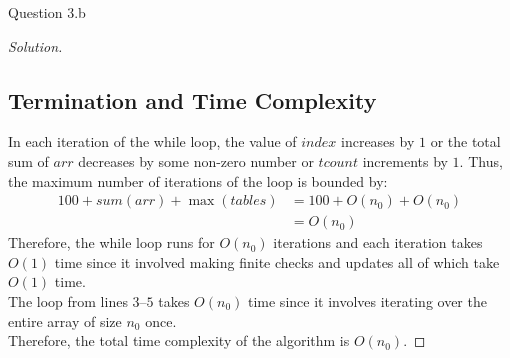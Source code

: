 \begin{solution}{Question 3.b}
\begin{proof}[Solution]
        \subsection*{Termination and Time Complexity}
        In each iteration of the while loop, the value of $index$ increases by $1$ or the total sum of $arr$ decreases by some non-zero number or $tcount$ increments by $1$. Thus, the maximum number of iterations of the loop is bounded by:
        \begin{equation}
            \begin{split}
                100+sum(arr)+\max(tables)&=100+O(n_0)+O(n_0)\\
                &=O(n_0)
            \end{split}
        \end{equation}
        Therefore, the while loop runs for $O(n_0)$ iterations and each iteration takes $O(1)$ time since it involved making finite checks and updates all of which take $O(1)$ time.\\
        The loop from lines $3\text{--}5$ takes $O(n_0)$ time since it involves iterating over the entire array of size $n_0$ once.\\
        Therefore, the total time complexity of the algorithm is $O(n_0)$.


\end{proof}
\end{solution}
